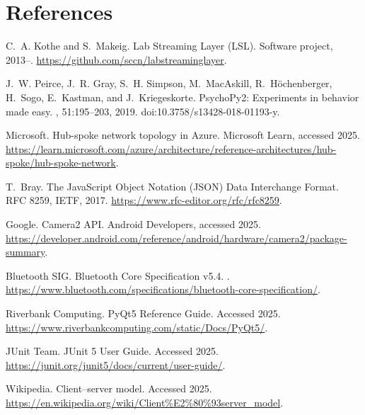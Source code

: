 \documentclass{report}
\begin{document}
    \chapter*{References}
    \begin{thebibliography}{99}

        C.~A. Kothe and S.~Makeig.
        \newblock Lab Streaming Layer (LSL).
        \newblock Software project, 2013–.
        \newblock \url{https://github.com/sccn/labstreaminglayer}.

        J.~W. Peirce, J.~R. Gray, S.~H. Simpson, M.~MacAskill, R.~H{\"o}chenberger, H.~Sogo, E.~Kastman, and J.~Kriegeskorte.
        \newblock PsychoPy2: Experiments in behavior made easy.
        , 51:195--203, 2019.
        \newblock doi:10.3758/s13428-018-01193-y.

        Microsoft.
        \newblock Hub-spoke network topology in Azure.
        \newblock Microsoft Learn, accessed 2025.
        \newblock \url{https://learn.microsoft.com/azure/architecture/reference-architectures/hub-spoke/hub-spoke-network}.

        T.~Bray.
        \newblock The JavaScript Object Notation (JSON) Data Interchange Format.
        \newblock RFC 8259, IETF, 2017.
        \newblock \url{https://www.rfc-editor.org/rfc/rfc8259}.

        Google.
        \newblock Camera2 API.
        \newblock Android Developers, accessed 2025.
        \newblock \url{https://developer.android.com/reference/android/hardware/camera2/package-summary}.

        Bluetooth SIG.
        \newblock Bluetooth Core Specification v5.4.
        .
        \newblock \url{https://www.bluetooth.com/specifications/bluetooth-core-specification/}.

        Riverbank Computing.
        \newblock PyQt5 Reference Guide.
        \newblock Accessed 2025.
        \newblock \url{https://www.riverbankcomputing.com/static/Docs/PyQt5/}.

        JUnit Team.
        \newblock JUnit 5 User Guide.
        \newblock Accessed 2025.
        \newblock \url{https://junit.org/junit5/docs/current/user-guide/}.

        Wikipedia.
        \newblock Client--server model.
        \newblock Accessed 2025.
        \newblock \url{https://en.wikipedia.org/wiki/Client%E2%80%93server_model}.

    \end{thebibliography}
\end{document}

